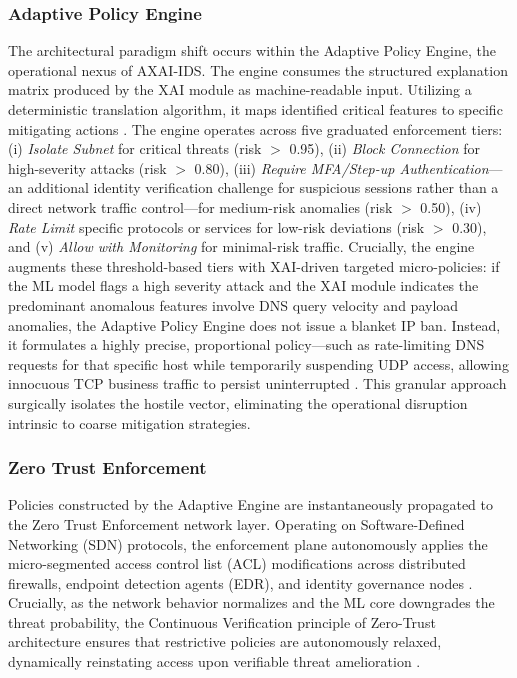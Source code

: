 \documentclass[conference]{IEEEtran}
\begin{document}
\subsubsection{Adaptive Policy Engine}
The architectural paradigm shift occurs within the Adaptive Policy Engine, the operational nexus of AXAI-IDS. The engine consumes the structured explanation matrix produced by the XAI module as machine-readable input. Utilizing a deterministic translation algorithm, it maps identified critical features to specific mitigating actions \cite{mahbooba2021explainable}. The engine operates across five graduated enforcement tiers: (i) \textit{Isolate Subnet} for critical threats (risk $>$ 0.95), (ii) \textit{Block Connection} for high-severity attacks (risk $>$ 0.80), (iii) \textit{Require MFA/Step-up Authentication}—an additional identity verification challenge for suspicious sessions rather than a direct network traffic control—for medium-risk anomalies (risk $>$ 0.50), (iv) \textit{Rate Limit} specific protocols or services for low-risk deviations (risk $>$ 0.30), and (v) \textit{Allow with Monitoring} for minimal-risk traffic. Crucially, the engine augments these threshold-based tiers with XAI-driven targeted micro-policies: if the ML model flags a high severity attack and the XAI module indicates the predominant anomalous features involve DNS query velocity and payload anomalies, the Adaptive Policy Engine does not issue a blanket IP ban. Instead, it formulates a highly precise, proportional policy—such as rate-limiting DNS requests for that specific host while temporarily suspending UDP access, allowing innocuous TCP business traffic to persist uninterrupted \cite{alotaibi2023adaptive}. This granular approach surgically isolates the hostile vector, eliminating the operational disruption intrinsic to coarse mitigation strategies.

\subsubsection{Zero Trust Enforcement}
Policies constructed by the Adaptive Engine are instantaneously propagated to the Zero Trust Enforcement network layer. Operating on Software-Defined Networking (SDN) protocols, the enforcement plane autonomously applies the micro-segmented access control list (ACL) modifications across distributed firewalls, endpoint detection agents (EDR), and identity governance nodes \cite{chen2016xgboost, ke2017lightgbm}. Crucially, as the network behavior normalizes and the ML core downgrades the threat probability, the Continuous Verification principle of Zero-Trust architecture ensures that restrictive policies are autonomously relaxed, dynamically reinstating access upon verifiable threat amelioration \cite{ahmad2020network}.
\end{document}
